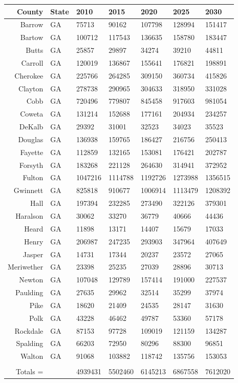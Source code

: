\begin{tabular}{r|*{6}{l}}
County & State & 2010 & 2015 & 2020 & 2025 & 2030 \\ 
\hline
Barrow & GA & 75713 & 90162 & 107798 & 128994 & 151417\\ 
Bartow & GA & 100712 & 117543 & 136635 & 158780 & 183447\\ 
Butts & GA & 25857 & 29897 & 34274 & 39210 & 44811\\ 
Carroll & GA & 120019 & 136867 & 155641 & 176821 & 198891\\ 
Cherokee & GA & 225766 & 264285 & 309150 & 360734 & 415826\\ 
Clayton & GA & 278738 & 290965 & 304633 & 318950 & 331028\\ 
Cobb & GA & 720496 & 779807 & 845458 & 917603 & 981054\\ 
Coweta & GA & 131214 & 152688 & 177161 & 204934 & 234257\\ 
DeKalb & GA & 29392 & 31001 & 32523 & 34023 & 35523\\ 
Douglas & GA & 136938 & 159765 & 186427 & 216756 & 250413\\ 
Fayette & GA & 112859 & 132165 & 153081 & 176421 & 202787\\ 
Forsyth & GA & 183268 & 221128 & 264630 & 314941 & 372952\\ 
Fulton & GA & 1047216 & 1114788 & 1192726 & 1273988 & 1356515\\ 
Gwinnett & GA & 825818 & 910677 & 1006914 & 1113479 & 1208392\\ 
Hall & GA & 197394 & 232285 & 273490 & 322126 & 379301\\ 
Haralson & GA & 30062 & 33270 & 36779 & 40666 & 44436\\ 
Heard & GA & 11898 & 13171 & 14407 & 15679 & 17033\\ 
Henry & GA & 206987 & 247235 & 293903 & 347964 & 407649\\ 
Jasper & GA & 14731 & 17344 & 20237 & 23572 & 27065\\ 
Meriwether & GA & 23398 & 25235 & 27039 & 28896 & 30713\\ 
Newton & GA & 107048 & 129789 & 157414 & 191000 & 227537\\ 
Paulding & GA & 27635 & 29962 & 32514 & 35299 & 37974\\ 
Pike & GA & 18620 & 21409 & 24535 & 28147 & 31630\\ 
Polk & GA & 43228 & 46462 & 49787 & 53360 & 57178\\ 
Rockdale & GA & 87153 & 97728 & 109019 & 121159 & 134287\\ 
Spalding & GA & 66203 & 72950 & 80296 & 88300 & 96851\\ 
Walton & GA & 91068 & 103882 & 118742 & 135756 & 153053\\ 
\\ 
\hline\hline
    Totals = &  & 4939431 & 5502460 & 6145213 & 6867558 & 7612020\newline
\end{tabular} \\ 
